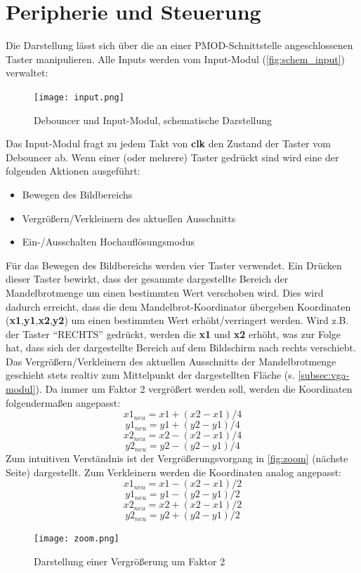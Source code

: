 \documentclass[a4paper,12pt,onesided]{report}
\begin{document}
\section{Peripherie und Steuerung}
\label{sec:peripheriesteuerung}
Die Darstellung lässt sich über die an einer PMOD-Schnittstelle angeschlossenen Taster manipulieren.
Alle Inputs werden vom Input-Modul (\autoref{fig:schem_input}) verwaltet:
\begin{figure}[H]
	\centering
	\texttt{[image: input.png]}
	\caption{Debouncer und Input-Modul, schematische Darstellung}
	\label{fig:schem_input}
\end{figure}
Das Input-Modul fragt zu jedem Takt von \textbf{clk} den Zustand der Taster vom Debouncer ab.
Wenn einer (oder mehrere) Taster gedrückt sind wird eine der folgenden Aktionen ausgeführt:
\begin{itemize}
	\item Bewegen des Bildbereichs
	\item Vergrößern/Verkleinern des aktuellen Ausschnitts
	\item Ein-/Ausschalten Hochauflösungsmodus
\end{itemize}
Für das Bewegen des Bildbereichs werden vier Taster verwendet.
Ein Drücken dieser Taster bewirkt, dass der gesammte dargestellte Bereich der Mandelbrotmenge um einen bestimmten Wert verschoben wird.
Dies wird dadurch erreicht, dass die dem Mandelbrot-Koordinator übergeben Koordinaten (\textbf{x1},\textbf{y1},\textbf{x2},\textbf{y2}) um einen bestimmten Wert erhöht/verringert werden.
Wird z.B. der Taster "`RECHTS"' gedrückt, werden die \textbf{x1} und \textbf{x2} erhöht, was zur Folge hat, dass sich der dargestellte Bereich auf dem Bildschirm nach rechts verschiebt.\\
Das Vergrößern/Verkleinern des aktuellen Ausschnitts der Mandelbrotmenge geschieht stets realtiv zum Mittelpunkt der dargestellten Fläche (s. \autoref{subsec:vga-modul}).
Da immer um Faktor 2 vergrößert werden soll, werden die Koordinaten folgendermaßen angepasst:
\[x1_{neu} = x1 + (x2-x1)/4\]
\[y1_{neu} = y1 + (y2-y1)/4\]
\[x2_{neu} = x2 - (x2-x1)/4\]
\[y2_{neu} = y2 - (y2-y1)/4\]
Zum intuitiven Verständnis ist der Vergrößerungsvorgang in \autoref{fig:zoom} (nächste Seite) dargestellt.
Zum Verkleinern werden die Koordinaten analog angepasst:
\[x1_{neu} = x1 - (x2-x1)/2\]
\[y1_{neu} = y1 - (y2-y1)/2\]
\[x2_{neu} = x2 + (x2-x1)/2\]
\[y2_{neu} = y2 + (y2-y1)/2\]
\begin{figure}[H]
	\centering
	\texttt{[image: zoom.png]}
	\caption{Darstellung einer Vergrößerung um Faktor 2}
	\label{fig:zoom}
\end{figure}
\end{document}
